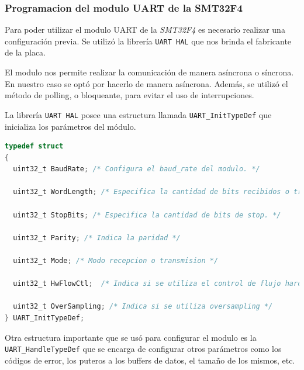 \documentclass[12pt]{article}
\begin{document}
\subsubsection{Programacion del modulo UART de la SMT32F4}
Para poder utilizar el modulo UART de la \textit{SMT32F4} es necesario realizar una configuración previa. Se utilizó la librería \texttt{UART HAL} que nos brinda el fabricante de la placa. 

El modulo nos permite realizar la comunicación de manera asíncrona o síncrona. En nuestro caso se optó por hacerlo de manera asíncrona. Además, se utilizó el método de polling, o bloqueante, para evitar el uso de interrupciones. 

La librería \texttt{UART HAL} posee una estructura llamada \texttt{UART\_InitTypeDef} que inicializa los parámetros del módulo.

\begin{lstlisting}[language=C]
  typedef struct
{
  uint32_t BaudRate; /* Configura el baud_rate del modulo. */

  uint32_t WordLength; /* Especifica la cantidad de bits recibidos o transmitidos en un frame. */

  uint32_t StopBits; /* Especifica la cantidad de bits de stop. */

  uint32_t Parity; /* Indica la paridad */

  uint32_t Mode; /* Modo recepcion o transmision */

  uint32_t HwFlowCtl;  /* Indica si se utiliza el control de flujo hardware */

  uint32_t OverSampling; /* Indica si se utiliza oversampling */
} UART_InitTypeDef;

\end{lstlisting}

Otra estructura importante que se usó para configurar el modulo es la \texttt{UART\_HandleTypeDef} que se encarga de configurar otros parámetros como los códigos de error, los puteros a los buffers de datos, el tamaño de los mismos, etc.
\end{document}

